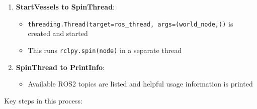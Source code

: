 \documentclass[
  letterpaper,
  DIV=11,
  numbers=noendperiod]{scrreprt}
\newenvironment{Shaded}{\begin{snugshade}}{\end{snugshade}}
\newcommand{\DecValTok}[1]{\textcolor[rgb]{0.68,0.00,0.00}{#1}}
\newcommand{\KeywordTok}[1]{\textcolor[rgb]{0.00,0.23,0.31}{\textbf{#1}}}
\newcommand{\NormalTok}[1]{\textcolor[rgb]{0.00,0.23,0.31}{#1}}
\newcommand{\OperatorTok}[1]{\textcolor[rgb]{0.37,0.37,0.37}{#1}}
\newcommand{\StringTok}[1]{\textcolor[rgb]{0.13,0.47,0.30}{#1}}
\newcommand{\VariableTok}[1]{\textcolor[rgb]{0.07,0.07,0.07}{#1}}
\providecommand{\tightlist}{%
  \setlength{\itemsep}{0pt}\setlength{\parskip}{0pt}}\usepackage{longtable,booktabs,array}
\begin{document}
\begin{enumerate}
\begin{itemize}
\begin{Shaded}
\begin{Highlighting}[]
\NormalTok{sensor }\OperatorTok{=}\NormalTok{ create\_sensor(sensor\_config, }\VariableTok{self}\NormalTok{.vessel\_id, }\VariableTok{self}\NormalTok{.topic\_prefix, }\VariableTok{self}\NormalTok{)}
\VariableTok{self}\NormalTok{.sensors.append(\{}
    \StringTok{\textquotesingle{}sensor\textquotesingle{}}\NormalTok{: sensor,}
    \StringTok{\textquotesingle{}pub\textquotesingle{}}\NormalTok{: }\VariableTok{self}\NormalTok{.world\_node.create\_publisher(}\VariableTok{self}\NormalTok{.\_get\_msg\_type(sensor.sensor\_type), sensor\_topic, }\DecValTok{10}\NormalTok{),}
    \StringTok{\textquotesingle{}timer\textquotesingle{}}\NormalTok{: }\VariableTok{self}\NormalTok{.world\_node.create\_timer(}\DecValTok{1}\OperatorTok{/}\NormalTok{sensor.rate, }\KeywordTok{lambda}\NormalTok{ s}\OperatorTok{=}\NormalTok{sensor: }\VariableTok{self}\NormalTok{.\_publish\_sensor(s))}
\NormalTok{\})}
\end{Highlighting}
\end{Shaded}
  \end{itemize}
\item
  \textbf{StartVessels to SpinThread}:

  \begin{itemize}
  \tightlist
  \item
    \texttt{threading.Thread(target=ros\_thread,\ args=(world\_node,))}
    is created and started
  \item
    This runs \texttt{rclpy.spin(node)} in a separate thread
  \end{itemize}
\item
  \textbf{SpinThread to PrintInfo}:

  \begin{itemize}
  \tightlist
  \item
    Available ROS2 topics are listed and helpful usage information is
    printed
  \end{itemize}
\end{enumerate}

Key steps in this process:
\end{document}
